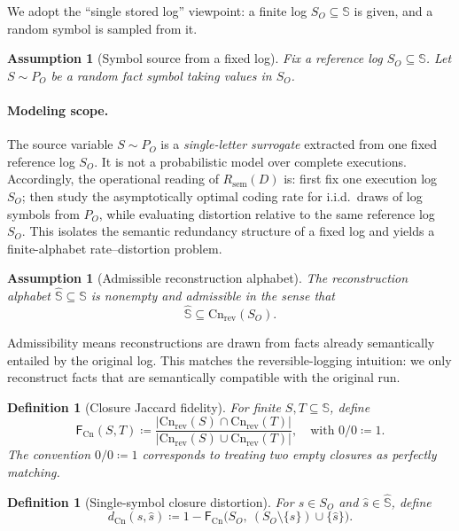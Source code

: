 \documentclass[twoside]{article}
\newtheorem{definition}[theorem]{Definition}
\newtheorem{assumption}[theorem]{Assumption}
\newcommand{\Cn}{\mathrm{Cn}}
\newcommand{\sem}{\mathrm{sem}}
\newcommand{\1}{\mathbf{1}}
\begin{document}
We adopt the ``single stored log'' viewpoint: a finite log \(S_O\subseteq\mathbb{S}\) is given, and a random symbol is sampled from it.

\begin{assumption}[Symbol source from a fixed log]
\label{assm:source}
Fix a reference log \(S_O\subseteq\mathbb{S}\).
Let \(S\sim P_O\) be a random \emph{fact symbol} taking values in \(S_O\).
\end{assumption}

\paragraph{Modeling scope.}
The source variable \(S\sim P_O\) is a \emph{single-letter surrogate} extracted from one fixed reference log \(S_O\).
It is not a probabilistic model over complete executions.
Accordingly, the operational reading of \(R_{\sem}(D)\) is: first fix one execution log \(S_O\); then study the asymptotically
optimal coding rate for i.i.d.\ draws of log symbols from \(P_O\), while evaluating distortion relative to the same reference log \(S_O\).
This isolates the semantic redundancy structure of a fixed log and yields a finite-alphabet rate--distortion problem.

\begin{assumption}[Admissible reconstruction alphabet]
\label{assm:admissible}
The reconstruction alphabet \(\hat{\mathbb{S}}\subseteq\mathbb{S}\) is nonempty and \emph{admissible} in the sense that
\[
\hat{\mathbb{S}} \subseteq \Cn_{\mathrm{rev}}(S_O).
\]
\end{assumption}

Admissibility means reconstructions are drawn from facts already semantically entailed by the original log.
This matches the reversible-logging intuition: we only reconstruct facts that are semantically compatible with the original run.

\begin{definition}[Closure Jaccard fidelity]
\label{def:fidelity}
For finite \(S,T\subseteq\mathbb{S}\), define
\[
\mathsf{F}_{\Cn}(S,T) \coloneqq
\frac{|\Cn_{\mathrm{rev}}(S)\cap \Cn_{\mathrm{rev}}(T)|}{|\Cn_{\mathrm{rev}}(S)\cup \Cn_{\mathrm{rev}}(T)|},
\quad \text{with } 0/0 \coloneqq 1.
\]
The convention \(0/0\coloneqq 1\) corresponds to treating two empty closures as perfectly matching.
\end{definition}

\begin{definition}[Single-symbol closure distortion]
\label{def:distortion}
For \(s\in S_O\) and \(\hat{s}\in \hat{\mathbb{S}}\), define
\[
d_{\Cn}(s,\hat{s})
\coloneqq 1-\mathsf{F}_{\Cn}\bigl(S_O,\ (S_O\setminus\{s\})\cup\{\hat{s}\}\bigr).
\]
\end{definition}
\end{document}
